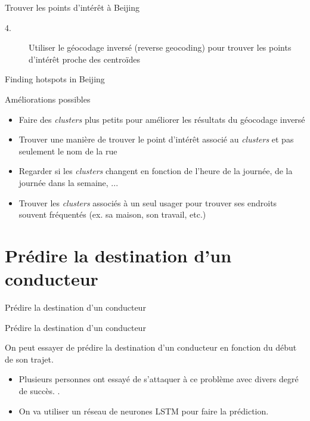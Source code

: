 \documentclass[aspectratio=169]{beamer}
\begin{document}
\begin{frame}{Trouver les points d'intérêt à Beijing}
\begin{center}
\begin{description}
	\item [4.] Utiliser le géocodage inversé (reverse geocoding) pour trouver les points d'intérêt proche des centroïdes
\end{description}
{\small }
\end{center}
\end{frame}

\begin{frame}{Finding hotspots in Beijing}

{\Large Améliorations possibles}
\vspace{.5cm}
\begin{itemize}
	\item Faire des \textit{clusters} plus petits pour améliorer les résultats du géocodage inversé
	\item Trouver une manière de trouver le point d'intérêt associé au \textit{clusters} et pas seulement le nom de la rue
	\item Regarder si les \textit{clusters} changent en fonction de l'heure de la journée, de la journée dans la semaine, ...
	\item Trouver les \textit{clusters} associés à un seul usager pour trouver ses endroits souvent fréquentés (ex. sa maison, son travail, etc.)
\end{itemize}
\end{frame}


\section{Prédire la destination d'un conducteur}

\begin{frame}{Prédire la destination d'un conducteur}

\begin{center}
{\LARGE Prédire la destination d'un conducteur}
\end{center}

On peut essayer de prédire la destination d'un conducteur en fonction du début de son trajet.
\vspace{.5cm}

\begin{itemize}
	\item Plusieurs personnes ont essayé de s'attaquer à ce problème avec divers degré de succès. \cite{de2015artificial, krumm2006predestination}.
	\item On va utiliser un réseau de neurones LSTM pour faire la prédiction.
\end{itemize}
\end{frame}
\end{document}

